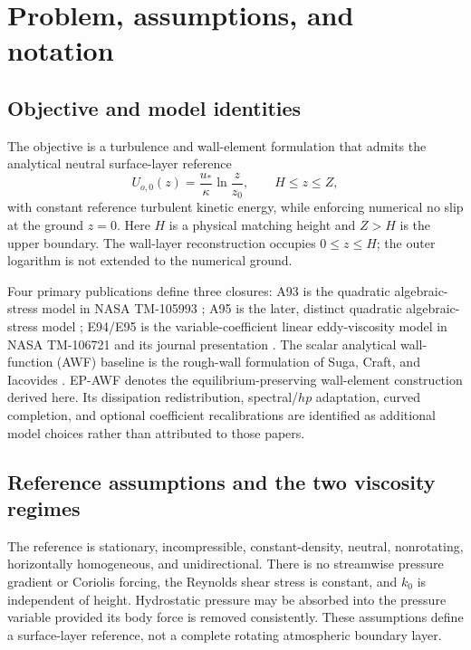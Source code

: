 \documentclass[11pt,a4paper]{article}
\numberwithin{equation}{section}
\newcommand{\ust}{u_*}
\begin{document}
\section{Problem, assumptions, and notation}
\label{sec:scope}

\subsection{Objective and model identities}

The objective is a turbulence and wall-element formulation that admits
the analytical neutral surface-layer reference
\begin{equation}
 U_{o,0}(z)=\frac{\ust}{\kappa}\ln\frac{z}{z_0},
 \qquad H\le z\le Z,
 \label{scope:target}
\end{equation}
with constant reference turbulent kinetic energy, while enforcing
numerical no slip at the ground $z=0$. Here $H$ is a physical matching
height and $Z>H$ is the upper boundary. The wall-layer reconstruction
occupies $0\le z\le H$; the outer logarithm is not extended to the
numerical ground.

Four primary publications define three closures:
A93 is the quadratic algebraic-stress model in NASA TM-105993
\citep{Shih1993}; A95 is the later, distinct quadratic algebraic-stress
model \citep{Shih1995ASM}; E94/E95 is the variable-coefficient linear
eddy-viscosity model in NASA TM-106721 and its journal presentation
\citep{Shih1994EVM,Shih1995EVM}. The scalar analytical wall-function
(AWF) baseline is the rough-wall formulation of Suga, Craft, and
Iacovides \citep{SCI2006}. EP-AWF denotes the
equilibrium-preserving wall-element construction derived here.
Its dissipation redistribution, spectral/$hp$ adaptation, curved
completion, and optional coefficient recalibrations are identified
as additional model choices rather than attributed to those papers.

\subsection{Reference assumptions and the two viscosity regimes}

The reference is stationary, incompressible, constant-density, neutral,
nonrotating, horizontally homogeneous, and unidirectional. There is no
streamwise pressure gradient or Coriolis forcing, the Reynolds shear
stress is constant, and $k_0$ is independent of height. Hydrostatic
pressure may be absorbed into the pressure variable provided its body
force is removed consistently. These assumptions define a surface-layer
reference, not a complete rotating atmospheric boundary layer.
\end{document}
